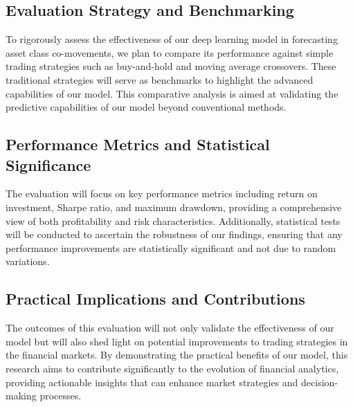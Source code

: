 \thesisspacing %

\subsection{Evaluation Strategy and Benchmarking}
To rigorously assess the effectiveness of our deep learning model in forecasting asset class co-movements, we plan to compare its performance against simple trading strategies such as buy-and-hold and moving average crossovers. These traditional strategies will serve as benchmarks to highlight the advanced capabilities of our model. This comparative analysis is aimed at validating the predictive capabilities of our model beyond conventional methods.

\subsection{Performance Metrics and Statistical Significance}
The evaluation will focus on key performance metrics including return on investment, Sharpe ratio, and maximum drawdown, providing a comprehensive view of both profitability and risk characteristics. Additionally, statistical tests will be conducted to ascertain the robustness of our findings, ensuring that any performance improvements are statistically significant and not due to random variations.

\subsection{Practical Implications and Contributions}
The outcomes of this evaluation will not only validate the effectiveness of our model but will also shed light on potential improvements to trading strategies in the financial markets. By demonstrating the practical benefits of our model, this research aims to contribute significantly to the evolution of financial analytics, providing actionable insights that can enhance market strategies and decision-making processes.
